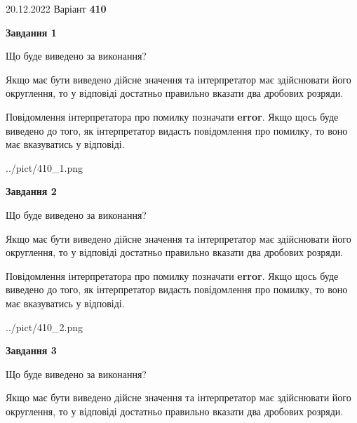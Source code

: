 \documentclass[12pt, ukrainian]{article}
\begin{document}
{20.12.2022 Варіант \No \textbf { 410 }\par}
{
\begin {Large}

{\begin {center}\textbf{Завдання 1}\end {center}}\par
Що буде виведено за виконання? \par

Якщо має бути виведено дійсне значення та інтерпретатор має здійснювати його округлення, 
то у відповіді достатньо правильно вказати два дробових розряди.

Повідомлення інтерпретатора про помилку позначати \textbf{error}.
Якщо щось буде виведено до того, як інтерпретатор видасть повідомлення про помилку, 
то воно має вказуватись у відповіді. \par

\begin{center}
	{../pict/410_1.png}
\end{center}
\newpage

{\begin {center}\textbf{Завдання 2}\end {center}}\par
Що буде виведено за виконання? \par

Якщо має бути виведено дійсне значення та інтерпретатор має здійснювати його округлення, 
то у відповіді достатньо правильно вказати два дробових розряди.

Повідомлення інтерпретатора про помилку позначати \textbf{error}.
Якщо щось буде виведено до того, як інтерпретатор видасть повідомлення про помилку, 
то воно має вказуватись у відповіді. \par

\begin{center}
	{../pict/410_2.png}
\end{center}
\newpage

{\begin {center}\textbf{Завдання 3}\end {center}}\par
Що буде виведено за виконання? \par

Якщо має бути виведено дійсне значення та інтерпретатор має здійснювати його округлення, 
то у відповіді достатньо правильно вказати два дробових розряди.


\end{Large}}
\end{document}
